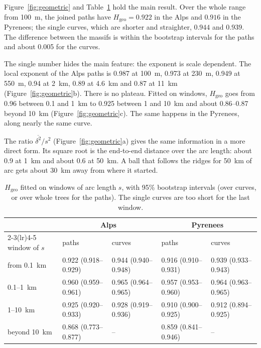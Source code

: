 \documentclass[11pt,a4paper]{article}
\newcommand{\Hgeo}{H_{\mathrm{geo}}}
\begin{document}
Figure~\ref{fig:geometric} and Table~\ref{tab:hgeo} hold the main result.
Over the whole range from 100~m, the joined paths have $\Hgeo = 0.922$ in the
Alps and $0.916$ in the Pyrenees; the single curves, which are shorter and
straighter, $0.944$ and $0.939$. The difference between the massifs is within
the bootstrap intervals for the paths and about 0.005 for the curves.

The single number hides the main feature: the exponent is scale dependent.
The local exponent of the Alps paths is 0.987 at 100~m, 0.973 at 230~m, 0.949
at 550~m, 0.94 at 2~km, 0.89 at 4.6~km and 0.87 at 11~km
(Figure~\ref{fig:geometric}b). There is no plateau. Fitted on windows, $\Hgeo$
goes from 0.96 between 0.1 and 1~km to 0.925 between 1 and 10~km and about
0.86--0.87 beyond 10~km (Figure~\ref{fig:geometric}c). The same happens in
the Pyrenees, along nearly the same curve.

The ratio $\overline{\delta^2}/s^2$ (Figure~\ref{fig:geometric}a) gives the same
information in a more direct form. Its square root is the end-to-end distance
over the arc length: about 0.9 at 1~km and about 0.6 at 50~km. A ball that
follows the ridges for 50~km of arc gets about 30~km away from where it
started.

\begin{table}[t]
\centering
\caption{$\Hgeo$ fitted on windows of arc length $s$, with 95\% bootstrap
intervals (over curves, or over whole trees for the paths). The single curves
are too short for the last window.}
\label{tab:hgeo}
\small
\setlength{\tabcolsep}{4pt}
\begin{tabular}{lllll}
\toprule
 & \multicolumn{2}{c}{Alps} & \multicolumn{2}{c}{Pyrenees} \\
\cmidrule(lr){2-3}\cmidrule(lr){4-5}
window of $s$ & paths & curves & paths & curves \\
\midrule
from 0.1~km & 0.922 (0.918--0.929) & 0.944 (0.940--0.948) & 0.916 (0.910--0.931) & 0.939 (0.933--0.943) \\
0.1--1~km   & 0.960 (0.959--0.961) & 0.965 (0.964--0.965) & 0.957 (0.953--0.960) & 0.964 (0.963--0.965) \\
1--10~km    & 0.925 (0.920--0.933) & 0.928 (0.919--0.936) & 0.910 (0.900--0.925) & 0.912 (0.894--0.925) \\
beyond 10~km & 0.868 (0.773--0.877) & -- & 0.859 (0.841--0.946) & -- \\
\bottomrule
\end{tabular}
\end{table}
\end{document}
